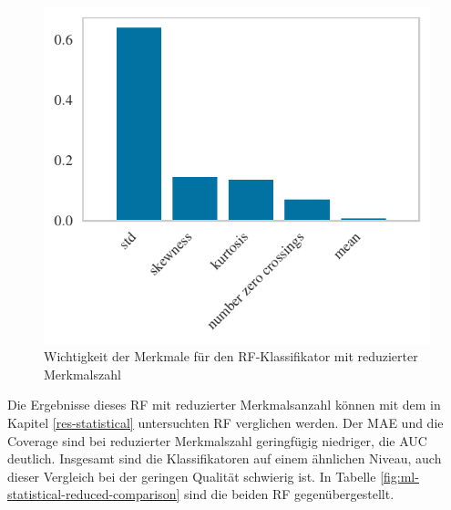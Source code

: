 \begin{figure}[H]
	\centering
	\includegraphics[scale=0.91]{pic/rf-reduced-statistical.pdf}
	\caption{Wichtigkeit der Merkmale für den \ac{RF}-Klassifikator mit reduzierter Merkmalszahl}
	\label{fig:rf-statistical-reduced}
\end{figure}

Die Ergebnisse dieses \acl{RF} mit reduzierter Merkmalsanzahl können mit dem in Kapitel \ref{res-statistical} untersuchten \acl{RF} verglichen werden. Der \ac{MAE} und die Coverage sind bei reduzierter Merkmalszahl geringfügig niedriger, die AUC deutlich. Insgesamt sind die Klassifikatoren auf einem ähnlichen Niveau, auch dieser Vergleich bei der geringen Qualität schwierig ist. In Tabelle \ref{fig:ml-statistical-reduced-comparison} sind die beiden \acl{RF} gegenübergestellt.


